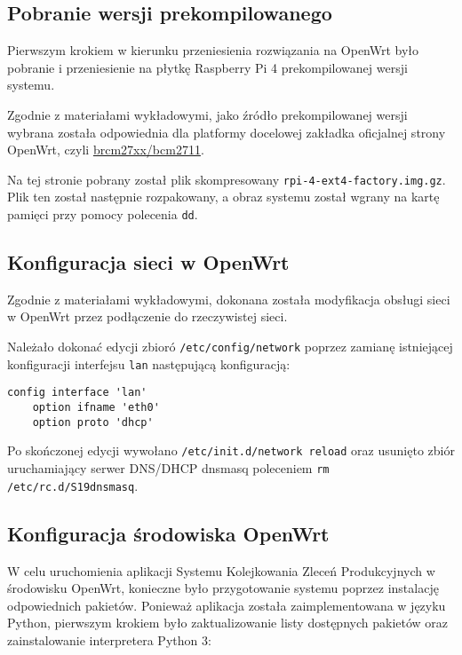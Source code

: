 \documentclass{article}
\begin{document}
\subsection{Pobranie wersji prekompilowanego}

Pierwszym krokiem w kierunku przeniesienia rozwiązania na OpenWrt było pobranie i przeniesienie na płytkę Raspberry Pi 4 prekompilowanej wersji systemu.

Zgodnie z materiałami wykładowymi, jako źródło prekompilowanej wersji wybrana została odpowiednia dla platformy docelowej zakładka oficjalnej strony OpenWrt, czyli \href{https://downloads.openwrt.org/releases/24.10.1/targets/bcm27xx/bcm2711/}{brcm27xx/bcm2711}. 

Na tej stronie pobrany został plik skompresowany \texttt{rpi-4-ext4-factory.img.gz}. Plik ten został następnie rozpakowany, a obraz systemu został wgrany na kartę pamięci przy pomocy polecenia \texttt{dd}.

\subsection{Konfiguracja sieci w OpenWrt}

Zgodnie z materiałami wykładowymi, dokonana została modyfikacja obsługi sieci w OpenWrt przez podłączenie do rzeczywistej sieci.

Należało dokonać edycji zbioró \texttt{/etc/config/network} poprzez zamianę istniejącej konfiguracji interfejsu \texttt{lan} następującą konfiguracją:

\begin{verbatim}
config interface 'lan'
    option ifname 'eth0'
    option proto 'dhcp'
\end{verbatim}

Po skończonej edycji wywołano \texttt{/etc/init.d/network reload} oraz usunięto zbiór uruchamiający serwer DNS/DHCP dnsmasq poleceniem \texttt{rm /etc/rc.d/S19dnsmasq}.

\subsection{Konfiguracja środowiska OpenWrt}
\label{konfiguracja}

W celu uruchomienia aplikacji Systemu Kolejkowania Zleceń Produkcyjnych w środowisku OpenWrt, konieczne było przygotowanie systemu poprzez instalację odpowiednich pakietów. Ponieważ aplikacja została zaimplementowana w języku Python, pierwszym krokiem było zaktualizowanie listy dostępnych pakietów oraz zainstalowanie interpretera Python 3:
\end{document}
